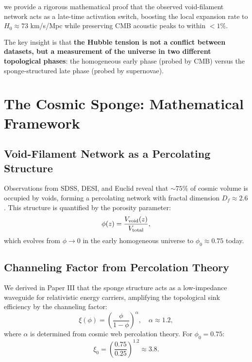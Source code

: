 \documentclass[12pt,a4paper]{article}
\begin{document}
we provide a rigorous mathematical proof that the observed void-filament network acts as a late-time activation switch, boosting the local expansion rate to $H_0 \approx 73$ km/s/Mpc while preserving CMB acoustic peaks to within $<1\%$.

The key insight is that \textbf{the Hubble tension is not a conflict between datasets, but a measurement of the universe in two different topological phases}: the homogeneous early phase (probed by CMB) versus the sponge-structured late phase (probed by supernovae).

\section{The Cosmic Sponge: Mathematical Framework}

\subsection{Void-Filament Network as a Percolating Structure}

Observations from SDSS, DESI, and Euclid reveal that $\sim 75\%$ of cosmic volume is occupied by voids, forming a percolating network with fractal dimension $D_f \approx 2.6$ \citep{Pan2012, Aragon2010}. This structure is quantified by the porosity parameter:
\begin{equation}
\phi(z) = \frac{V_{\rm void}(z)}{V_{\rm total}},
\end{equation}
which evolves from $\phi \to 0$ in the early homogeneous universe to $\phi_0 \approx 0.75$ today.

\subsection{Channeling Factor from Percolation Theory}

We derived in Paper III that the sponge structure acts as a low-impedance waveguide for relativistic energy carriers, amplifying the topological sink efficiency by the channeling factor:
\begin{equation}
\xi(\phi) = \left(\frac{\phi}{1-\phi}\right)^\alpha, \quad \alpha \approx 1.2,
\label{eq:xi}
\end{equation}
where $\alpha$ is determined from cosmic web percolation theory. For $\phi_0 = 0.75$:
\begin{equation}
\xi_0 = \left(\frac{0.75}{0.25}\right)^{1.2} \approx 3.8.
\end{equation}
\end{document}
